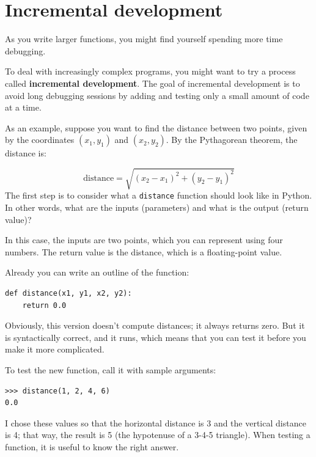 \documentclass[10pt]{book}
\begin{document}
\section{Incremental development}
\label{incremental development}

As you write larger functions, you might find yourself
spending more time debugging.

To deal with increasingly complex programs,
you might want to try a process called
{\bf incremental development}.  The goal of incremental development
is to avoid long debugging sessions by adding and testing only
a small amount of code at a time.


As an example, suppose you want to find the distance between two
points, given by the coordinates $(x_1, y_1)$ and $(x_2, y_2)$.
By the Pythagorean theorem, the distance is:

\begin{displaymath}
\mathrm{distance} = \sqrt{(x_2 - x_1)^2 + (y_2 - y_1)^2}
\end{displaymath}
%
The first step is to consider what a {\tt distance} function should
look like in Python.  In other words, what are the inputs (parameters)
and what is the output (return value)?

In this case, the inputs are two points, which you can represent
using four numbers.  The return value is the distance, which is
a floating-point value.

Already you can write an outline of the function:

\beforeverb
\begin{verbatim}
def distance(x1, y1, x2, y2):
    return 0.0
\end{verbatim}
\afterverb
%
Obviously, this version doesn't compute distances; it always returns
zero.  But it is syntactically correct, and it runs, which means that
you can test it before you make it more complicated.

To test the new function, call it with sample arguments:

\beforeverb
\begin{verbatim}
>>> distance(1, 2, 4, 6)
0.0
\end{verbatim}
\afterverb
%
I chose these values so that the horizontal distance is 3 and the
vertical distance is 4; that way, the result is 5
(the hypotenuse of a 3-4-5 triangle). When testing a function, it is
useful to know the right answer.
\end{document}
